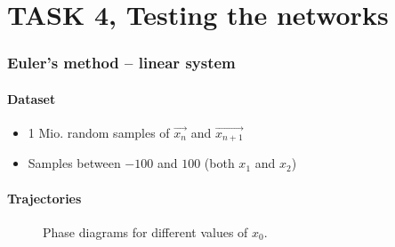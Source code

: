 \section{TASK 4, Testing the networks}

\begin{frame}
	\frametitle{Euler's method -- linear system}
	\paragraph{Dataset}\vspace{-2mm}
	\begin{itemize}
		\item 1 Mio. random samples of $\overrightarrow{x_{n}}$ and $\overrightarrow{x_{n+1}}$
		\item Samples between $-100$ and $100$ (both $x_1$ and $x_2$)
	\end{itemize}
	\paragraph{Trajectories}\vspace{-2mm}
	\begin{figure}[H]
		\quad
		\quad
		\caption{Phase diagrams for different values of $x_0$.}
	\end{figure}
\end{frame}

